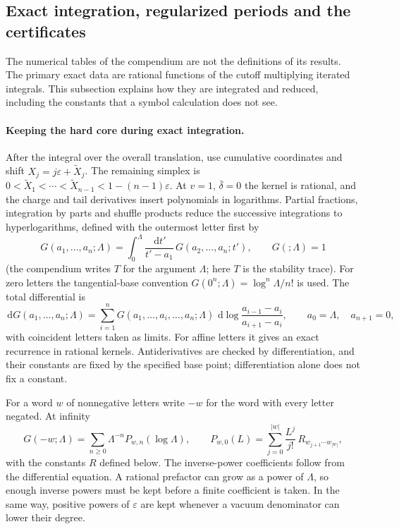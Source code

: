 \documentclass[11pt,a4paper]{article}
\numberwithin{equation}{section}
\newcommand{\dd}{\,\mathrm d}
\newcommand{\db}{\bar\delta}
\begin{document}
\subsection{Exact integration, regularized periods and the certificates}\label{app:dualC:certificates}
The numerical tables of the compendium are not the definitions of its results. The primary exact data are rational
functions of the cutoff multiplying iterated integrals. This subsection explains how they are integrated and reduced,
including the constants that a symbol calculation does not see.

\paragraph{Keeping the hard core during exact integration.} After the integral over the overall translation, use
cumulative coordinates and shift $X_j=j\varepsilon+\tilde X_j$. The remaining simplex is
$0<\tilde X_1<\cdots<\tilde X_{n-1}<1-(n-1)\varepsilon$. At $v=1$, $\db=0$ the kernel is rational, and the charge and tail
derivatives insert polynomials in logarithms. Partial fractions, integration by parts and shuffle products reduce the
successive integrations to hyperlogarithms, defined with the outermost letter first by
\begin{equation}
 G(a_1,\ldots,a_n;\Lambda)=\int_0^\Lambda\frac{\dd t'}{t'-a_1}\,G(a_2,\ldots,a_n;t'),\qquad G(;\Lambda)=1
 \label{eq:dualC:gpl}
\end{equation}
(the compendium writes $T$ for the argument $\Lambda$; here $T$ is the stability trace). For zero letters the
tangential-base convention $G(0^n;\Lambda)=\log^n\Lambda/n!$ is used. The total differential is
\begin{equation}
 \dd G(a_1,\ldots,a_n;\Lambda)=\sum_{i=1}^nG(a_1,\ldots,\widehat{a_i},\ldots,a_n;\Lambda)\,
 \dd\log\frac{a_{i-1}-a_i}{a_{i+1}-a_i},\qquad a_0=\Lambda,\quad a_{n+1}=0,
 \label{eq:dualC:totaldiff}
\end{equation}
with coincident letters taken as limits. For affine letters it gives an exact recurrence in rational kernels.
Antiderivatives are checked by differentiation, and their constants are fixed by the specified base point;
differentiation alone does not fix a constant.

For a word $w$ of nonnegative letters write $-w$ for the word with every letter negated. At infinity
\begin{equation}
 G(-w;\Lambda)=\sum_{n\ge0}\Lambda^{-n}P_{w,n}(\log\Lambda),\qquad
 P_{w,0}(L)=\sum_{j=0}^{|w|}\frac{L^j}{j!}\,R_{w_{j+1}\cdots w_{|w|}},
 \label{eq:dualC:infinity}
\end{equation}
with the constants $R$ defined below. The inverse-power coefficients follow from the differential equation. A rational
prefactor can grow as a power of $\Lambda$, so enough inverse powers must be kept before a finite coefficient is taken.
In the same way, positive powers of $\varepsilon$ are kept whenever a vacuum denominator can lower their degree.
\end{document}
